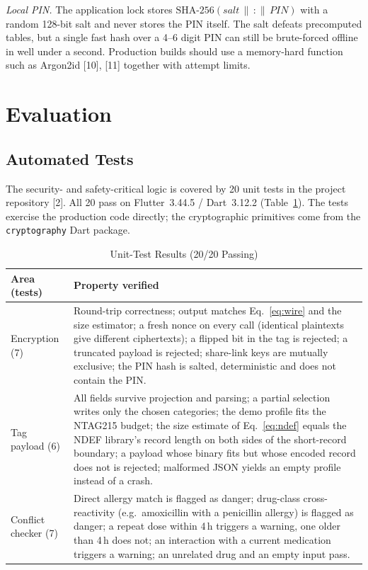 \emph{Local PIN.} The application lock stores $\mathrm{SHA\text{-}256}(\mathit{salt}
\,\|\, \texttt{:} \,\|\, \mathit{PIN})$ with a random 128-bit salt and never
stores the PIN itself. The salt defeats precomputed tables, but a single fast
hash over a 4--6 digit PIN can still be brute-forced offline in well under a
second. Production builds should use a memory-hard function such as Argon2id
[10], [11] together with attempt limits.


\section{Evaluation}
\label{sec:eval}

\subsection{Automated Tests}

The security- and safety-critical logic is covered by 20 unit tests in the
project repository [2]. All 20 pass on Flutter~3.44.5 / Dart~3.12.2
(Table~\ref{tab:tests}). The tests exercise the production code directly;
the cryptographic primitives come from the \texttt{cryptography} Dart
package.

\begin{table}[htbp]
\caption{Unit-Test Results (20/20 Passing)}
\label{tab:tests}
\centering
\begin{tabular}{@{}p{}p{}@{}}
\toprule
Area (tests) & Property verified \\
\midrule
Encryption (7) &
Round-trip correctness; output matches Eq.~\eqref{eq:wire} and the size
estimator; a fresh nonce on every call (identical plaintexts give different
ciphertexts); a flipped bit in the tag is rejected; a truncated payload is
rejected; share-link keys are mutually exclusive; the PIN hash is salted,
deterministic and does not contain the PIN. \\
\addlinespace
Tag payload (6) &
All fields survive projection and parsing; a partial selection writes only
the chosen categories; the demo profile fits the NTAG215 budget; the size
estimate of Eq.~\eqref{eq:ndef} equals the NDEF library's record length on
both sides of the short-record boundary; a payload whose binary fits but
whose encoded record does not is rejected; malformed JSON yields an empty
profile instead of a crash. \\
\addlinespace
Conflict checker (7) &
Direct allergy match is flagged as danger; drug-class cross-reactivity
(e.g.\ amoxicillin with a penicillin allergy) is flagged as danger; a repeat
dose within 4\,h triggers a warning, one older than 4\,h does not; an
interaction with a current medication triggers a warning; an unrelated drug
and an empty input pass. \\
\bottomrule
\end{tabular}
\end{table}

